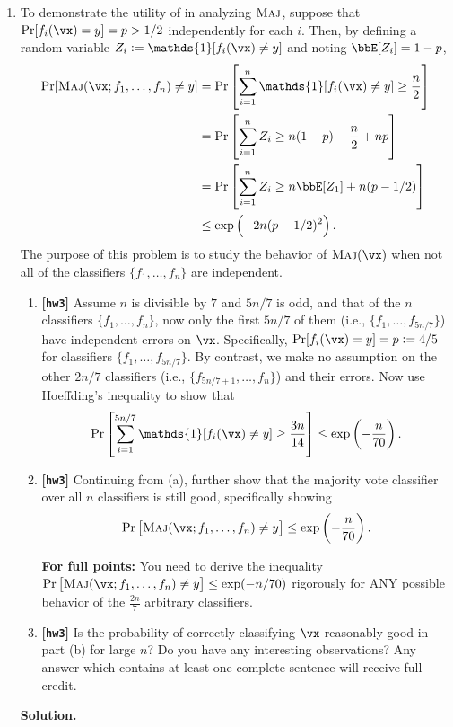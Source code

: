 \documentclass{article}
\def\1{\mathds{1}}
\def\hw{\textbf{[\texttt{hw3}]}\xspace}
\theoremstyle{definition}
\theoremstyle{remark}
\newenvironment{Q}
{%
\clearpage
\item
}
{%
\phantom{s} %
\bigskip
\textbf{Solution.}
}
\begin{document}
\begin{enumerate}[font={\Large\bfseries},left=0pt]
\begin{Q}
     To demonstrate the utility of  in analyzing $\textsc{Maj}$, suppose
     that $\Pr[ f_i(\vx) = y ] = p > 1/2$ independently for each $i$.
     Then, by defining a random variable $Z_i := \1[ f_i(\vx) \neq y]$
     and noting $\bbE [Z_i] = 1 - p$,
     \begin{align*}
       \Pr[\maj(\vx;f_1,\ldots,f_n) \neq y]
       &=
       \Pr\sbr{ \sum_{i=1}^n \1[ f_i(\vx) \neq y] \geq \frac n 2 }
       \\
       &=
       \Pr\sbr{ \sum_{i=1}^n Z_i \geq n(1-p) - \frac n 2 + np }
       \\
       &=
       \Pr\sbr{ \sum_{i=1}^n Z_i \geq n \bbE [Z_1] + n(p-1/2) }
       \\
       &\leq
       \exp\del{ -2n(p-1/2)^2 }.
     \end{align*}
     The purpose of this problem is to study the behavior of $\maj(\vx)$ when not all of the classifiers $\{f_1,\ldots,f_n\}$ are independent.
     \begin{enumerate}
       \item \hw
         Assume $n$ is divisible by $7$ and $5n/7$ is odd,
         and that of the $n$ classifiers $\{f_1,\ldots,f_n\}$,
         now only the first $5n/7$ of them (i.e., $\{f_1,\ldots,f_{5n/7}\}$) have independent errors on $\vx$.
         Specifically, $\Pr[f_i(\vx) = y] = p := 4/5$ for classifiers $\{f_1,\ldots,f_{5n/7}\}$.
         By contrast, we make no assumption on the other $2n/7$ classifiers (i.e., $\{f_{5n/7+1},\ldots,f_{n}\}$) and their errors. Now use Hoeffding's inequality to show that            
         \[
         	\Pr\sbr{ \sum_{i=1}^{5n/7} \1[ f_i(\vx) \neq y] \geq \frac{3n}{14} }\le
          \exp\del{ -\frac{n}{70}  }.
		\]
    
    	\item \hw Continuing from (a), further show that the majority vote classifier
    	over all $n$ classifiers is still good,  specifically showing  \[
    	\Pr\sbr{ \maj(\vx;f_1,\ldots,f_n) \neq y } \leq \exp\del{ -\frac{n}{70}  }.
    	\]
    	
  
  \textbf{For full points:} You need to derive the inequality $\Pr\sbr{ \maj(\vx;f_1,\dots,f_n) \neq y } \leq \exp(-n / 70)$ rigorously for ANY possible behavior of the $\frac{2n}{7}$ arbitrary classifiers.


  		\item \hw Is the probability of correctly classifying $\vx$ reasonably good in part (b) for large $n$? Do you have any interesting observations? Any answer which contains at least one complete sentence will receive full credit.


\end{enumerate}
\end{Q}
\end{enumerate}
\end{document}
